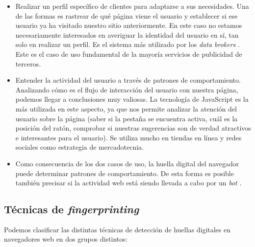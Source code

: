 \begin{itemize}
	\item Realizar un perfil específico de clientes para adaptarse a sus necesidades. Una de las formas es rastrear de qué página viene el usuario y establecer si ese usuario ya ha visitado nuestro sitio anteriormente. En este caso no estamos necesariamente interesados en averiguar la identidad del usuario en sí, tan solo en realizar un perfil. Es el sistema más utilizado por los \textit{data brokers} \cite{data_brocker}. Este es el caso de uso fundamental de la mayoría servicios de publicidad de terceros. \par 
	
	\item Entender la actividad del usuario a través de patrones de comportamiento. Analizando cómo es el flujo de interacción del usuario con nuestra página, podemos llegar a conclusiones muy valiosas. La tecnología de JavaScript es la más utilizada en este aspecto, ya que nos permite analizar la atención del usuario sobre la página (saber si la pestaña se encuentra activa, cuál es la posición del ratón, comprobar si nuestras sugerencias son de verdad atractivos e interesantes para el usuario). Se utiliza mucho en tiendas en línea y redes sociales como estrategia de mercadotecnia. \par 
	
	\item Como consecuencia de los dos casos de uso, la huella digital del navegador puede determinar patrones de comportamiento. De esta forma es posible también precisar si la actividad web está siendo llevada a cabo por un \textit{bot} \cite{bot_paper}. \par 
\end{itemize}

\subsection{Técnicas de \textit{fingerprinting}}

Podemos clasificar las distintas técnicas de detección de huellas digitales en navegadores web en dos grupos distintos: \par 

